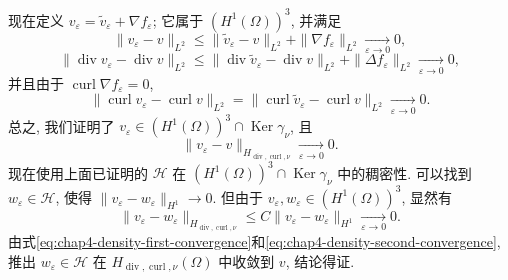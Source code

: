 \begin{Proof}
\begin{enumerate}
 现在定义 $v_\varepsilon=\widetilde v_\varepsilon+\nabla f_\varepsilon$;
 它属于 $(H^1(\Omega))^3$, 并满足
 \[
  \|v_\varepsilon-v\|_{L^2}
  \leq\|\widetilde v_\varepsilon-v\|_{L^2}+\|\nabla f_\varepsilon\|_{L^2}
  \underset{\varepsilon\to0}{\longrightarrow}0,
 \]
 \[
  \|\operatorname{div}v_\varepsilon-\operatorname{div}v\|_{L^2}
  \leq\|\operatorname{div}\widetilde v_\varepsilon-\operatorname{div}v\|_{L^2}
  +\|\Delta f_\varepsilon\|_{L^2}
  \underset{\varepsilon\to0}{\longrightarrow}0,
 \]
 并且由于 $\operatorname{curl}\nabla f_\varepsilon=0$,
 \[
  \|\operatorname{curl}v_\varepsilon-\operatorname{curl}v\|_{L^2}
  =\|\operatorname{curl}\widetilde v_\varepsilon-\operatorname{curl}v\|_{L^2}
  \underset{\varepsilon\to0}{\longrightarrow}0.
 \]
 总之, 我们证明了 $v_\varepsilon\in(H^1(\Omega))^3\cap\operatorname{Ker}\gamma_\nu$, 且
 \begin{equation}
  \|v_\varepsilon-v\|_{H_{\operatorname{div},\operatorname{curl},\nu}}
  \underset{\varepsilon\to0}{\longrightarrow}0.
  \label{eq:chap4-density-first-convergence}
 \end{equation}
 现在使用上面已证明的 $\mathcal H$ 在 $(H^1(\Omega))^3\cap\operatorname{Ker}\gamma_\nu$ 中的稠密性.
 可以找到 $w_\varepsilon\in\mathcal H$, 使得
 $\|v_\varepsilon-w_\varepsilon\|_{H^1}\to0$. 但由于
 $v_\varepsilon,w_\varepsilon\in(H^1(\Omega))^3$, 显然有
 \begin{equation}
  \|v_\varepsilon-w_\varepsilon\|_{H_{\operatorname{div},\operatorname{curl},\nu}}
  \leq C\|v_\varepsilon-w_\varepsilon\|_{H^1}
  \underset{\varepsilon\to0}{\longrightarrow}0.
  \label{eq:chap4-density-second-convergence}
 \end{equation}
 由式\eqref{eq:chap4-density-first-convergence}和\eqref{eq:chap4-density-second-convergence},
 推出 $w_\varepsilon\in\mathcal H$ 在 $H_{\operatorname{div},\operatorname{curl},\nu}(\Omega)$ 中收敛到 $v$, 结论得证.
\end{enumerate}
\end{Proof}

